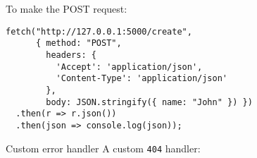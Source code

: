 \documentclass[../index.tex]{subfiles}
\begin{document}
\begin{frame}[fragile]{\currenttitle}
  To make the POST request: \\
  \vspace*{1em}

  \begin{lstlisting}[language=ES6,basicstyle=\ttfamily\footnotesize]
fetch("http://127.0.0.1:5000/create",
      { method: "POST",
        headers: {
          'Accept': 'application/json',
          'Content-Type': 'application/json'
        },
        body: JSON.stringify({ name: "John" }) })
  .then(r => r.json())
  .then(json => console.log(json));
  \end{lstlisting}
\end{frame}

\renewcommand{\currenttitle}{Custom error handler}
\begin{frame}[fragile]{\currenttitle}
  A custom \texttt{404} handler:
\end{frame}


\end{document}
